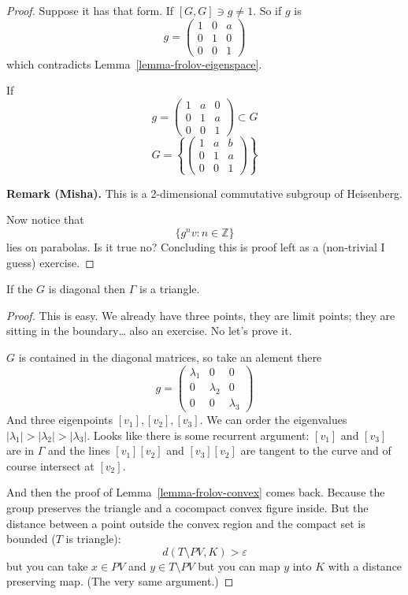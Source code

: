 \begin{proof}
Suppose it has that form. If $[G,G]\ni g\neq
1$. So if $g$ is
$$g=\begin{pmatrix} 1 & 0 & a\\ 0 & 1 & 0\\ 0
& 0 & 1 \end{pmatrix}$$
which contradicts
Lemma~\ref{lemma-frolov-eigenspace}.

If
$$g=\begin{pmatrix} 1 & a & 0\\ 0 & 1 & a\\ 0
& 0 & 1 \end{pmatrix} \subset G$$
$$G=\left\{ \begin{pmatrix} 1& a & b\\0 & 1 &
a\\ 0 & 0 & 1 \end{pmatrix} \right\}$$

\medskip\noindent
{\bf Remark (Misha).}
This is a 2-dimensional commutative subgroup
of Heisenberg.

\medskip
Now notice that
$$\{g^nv:n \in \mathbb{Z}\}$$
lies on parabolas. Is it true no? Concluding
this is proof left as a (non-trivial I guess)
exercise.
\end{proof}

\begin{lemma}
\label{lemma-frolov-diagonal}
If the $G$ is diagonal then $\Gamma$ is a
triangle.
\end{lemma}

\begin{proof}
This is easy. We already have three points,
they are limit points; they are sitting in
the boundary… also an exercise. No let's
prove it.

$G$ is contained in the diagonal matrices, so
take an alement there
$$g=\begin{pmatrix} \lambda_1 & 0 & 0\\ 0 &
\lambda_2 & 0\\ 0 & 0 & \lambda_3
\end{pmatrix}$$
And three eigenpoints $[v_1], [v_2], [v_3]$.
We can order the eigenvalues
$|\lambda_1|>|\lambda_2|>|\lambda_3|$. Looks
like there is some recurrent argument:
$[v_1]$ and $[v_3]$ are in $\Gamma$ and the
lines $[v_1][v_2]$ and $[v_3][v_2]$ are
tangent to the curve and of course intersect
at $[v_2]$.

And then the proof of
Lemma~\ref{lemma-frolov-convex} comes back.
Because the group preserves the triangle and
a cocompact convex figure inside. But the
distance between a point outside the convex
region and the compact set is bounded ($T$ is
triangle):
$$d(T\setminus PV,K)>\varepsilon$$
but you can take $x \in PV$ and $y\in
T\setminus PV$ but you can map $y$ into $K$
with a distance preserving map. (The very
same argument.)
\end{proof}

